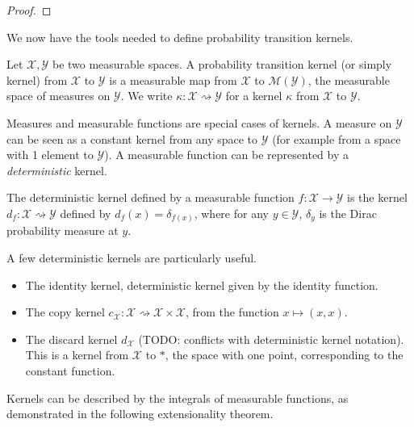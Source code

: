 \begin{proof}\leanok
\uses{}
\end{proof}

We now have the tools needed to define probability transition kernels.

\begin{definition}[Kernel]
  \label{def:kernel}
  \leanok
  Let $\mathcal X, \mathcal Y$ be two measurable spaces.
  A probability transition kernel (or simply kernel) from $\mathcal X$ to $\mathcal Y$ is a measurable map from $\mathcal X$ to $\mathcal M (\mathcal Y)$, the measurable space of measures on $\mathcal Y$.
  We write $\kappa : \mathcal X \rightsquigarrow \mathcal Y$ for a kernel $\kappa$ from $\mathcal X$ to $\mathcal Y$.
\end{definition}

Measures and measurable functions are special cases of kernels. A measure on $\mathcal Y$ can be seen as a constant kernel from any space to $\mathcal Y$ (for example from a space with 1 element to $\mathcal Y$).
A measurable function can be represented by a \emph{deterministic} kernel.

\begin{definition}
  \label{def:deterministic_kernel}
  \leanok
  The deterministic kernel defined by a measurable function $f : \mathcal X \to \mathcal Y$ is the kernel $d_f: \mathcal X \rightsquigarrow \mathcal Y$ defined by $d_f(x) = \delta_{f(x)}$, where for any $y \in \mathcal Y$, $\delta_y$ is the Dirac probability measure at $y$.
\end{definition}

A few deterministic kernels are particularly useful.
\begin{itemize}
  \item The identity kernel, deterministic kernel given by the identity function.
  \item The copy kernel $c_{\mathcal X} : \mathcal X \rightsquigarrow \mathcal X \times \mathcal X$, from the function $x \mapsto (x, x)$.
  \item The discard kernel $d_{\mathcal X}$ (TODO: conflicts with deterministic kernel notation). This is a kernel from $\mathcal X$ to $*$, the space with one point, corresponding to the constant function.
\end{itemize}

Kernels can be described by the integrals of measurable functions, as demonstrated in the following extensionality theorem.

